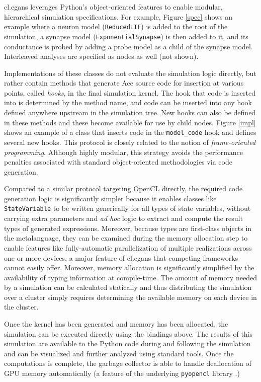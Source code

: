 \documentclass[9pt,preprint]{sigplanconf}
\begin{document}
{\sf cl.egans} leverages Python's object-oriented features to enable modular, hierarchical simulation specifications. For example, Figure \ref{spec} shows an example where a neuron model (\verb|ReducedLIF|) is added to the root of the simulation, a synapse model (\verb|ExponentialSynapse|) is then added to it, and its conductance is probed by adding a probe model as a child of the synapse model. Interleaved analyses are specified as nodes as well (not shown).

Implementations of these classes do not evaluate the simulation logic directly, but rather contain methods that generate Ace source code for insertion at various points, called {\it hooks}, in the final simulation kernel. The hook that code is inserted into is determined by the method name, and code can be inserted into any hook defined anywhere upstream in the simulation tree. New hooks can also be defined in these methods and these become available for use by child nodes. Figure \ref{impl} shows an example of a class that inserts code in the \verb|model_code| hook and defines several new hooks. This protocol is closely related to the notion of {\it frame-oriented programming}. Although highly modular, this strategy avoids the performance penalties associated with standard object-oriented methodologies via code generation.

Compared to a similar protocol targeting OpenCL directly, the required code generation logic is significantly simpler because it enables classes like \verb|StateVariable| to be written generically for all types of state variables, without carrying extra parameters and {\it ad hoc} logic to extract and compute the result types of generated expressions. Moreover, because types are first-class objects in the metalanguage, they can be examined during the memory allocation step to enable features like fully-automatic parallelization of multiple realizations across one or more devices, a major feature of {\sf cl.egans} that competing frameworks cannot easily offer. Moreover, memory allocation is significantly simplified by the availability of typing information at compile-time. The amount of memory needed by a simulation can be calculated statically and thus distributing the simulation over a cluster simply requires determining the available memory on each device in the cluster.

Once the kernel has been generated and memory has been allocated, the simulation can be executed directly  using the bindings above. The results of this simulation are available to the Python code during and following the simulation and can be visualized and further analyzed using standard tools. Once the computations is complete, the  garbage collector is able to handle deallocation of GPU memory automatically (a feature of the underlying \verb|pyopencl| library \cite{klockner2011pycuda}.)
\end{document}

